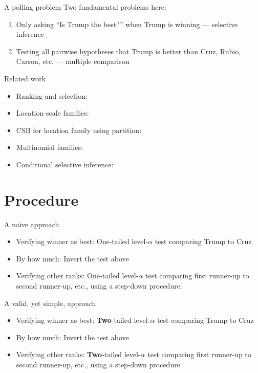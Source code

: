 \documentclass{beamer}
\begin{document}
\begin{frame}{A polling problem}
Two fundamental problems here:
\begin{enumerate}
	\item Only asking ``Is Trump the best?'' when Trump is winning --- selective inference
	\item Testing all pairwise hypotheses that Trump is better than Cruz, Rubio, Carson, etc. --- multiple comparison
\end{enumerate}
\end{frame}

\begin{frame}{Related work}
\begin{itemize}
\item Ranking and selection: \citet{Gupta:1971wk,Gupta:1985bj,Gutmann:1987fk}
\item Location-scale families: \citet{Gutmann:1987fk,Bofinger:1991hv,Maymin:1992fz,Karnnan:2009iv}
\item CSB for location family using partition: \citet{Stefansson:1988wj}
\item Multinomial families: \citet{Gupta:1967wg,Gupta:1976vd,Berger:1980ev,Nettleton:2009ht,Gupta:1989fe,Ng:2007cn,Gupta:1967wg}

\item Conditional selective inference: \citet{Fithian:2014ws}
\end{itemize}
\end{frame}

\section{Procedure}

\begin{frame}{A na\"ive approach}
\begin{itemize}
\item Verifying winner as best: One-tailed level-$\alpha$ test comparing Trump to Cruz
\item By how much: Invert the test above
\item Verifying other ranks: One-tailed level-$\alpha$ test comparing first runner-up to second runner-up, etc., using a step-down procedure.
\end{itemize}
\end{frame}

\begin{frame}{A valid, yet simple, approach}
\begin{itemize}
\item Verifying winner as best: {\bf Two}-tailed level-$\alpha$ test comparing Trump to Cruz
\item By how much: Invert the test above
\item Verifying other ranks: {\bf Two}-tailed level-$\alpha$ test comparing first runner-up to second runner-up, etc., using a step-down procedure
\end{itemize}
\end{frame}
\end{document}
